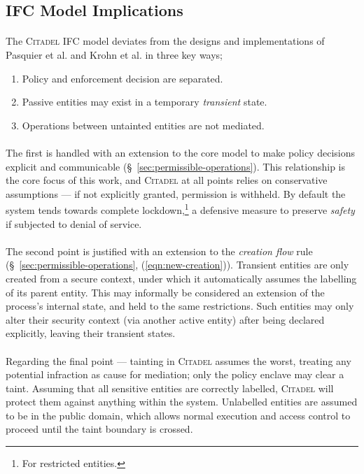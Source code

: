 \subsection{IFC Model Implications}
\label{sec:ifc-model-implications}

\paragraph{} The \textsc{Citadel} IFC model deviates from the designs and implementations of Pasquier et al. and Krohn et al. in three key ways;
\begin{enumerate}
    \item Policy and enforcement decision are separated.
    \item Passive entities may exist in a temporary \textit{transient} state.
    \item Operations between untainted entities are not mediated.
\end{enumerate}

\paragraph{} The first is handled with an extension to the core model to make policy decisions explicit and communicable (§~\ref{sec:permissible-operations}). This relationship is the core focus of this work, and \textsc{Citadel} at all points relies on conservative assumptions --- if not explicitly granted, permission is withheld. By default the system tends towards complete lockdown,\footnote{For restricted entities.} a defensive measure to preserve \textit{safety} if subjected to denial of service.

\paragraph{} The second point is justified with an extension to the \textit{creation flow} rule (§~\ref{sec:permissible-operations}, (\ref{eqn:new-creation})). Transient entities are only created from a secure context, under which it automatically assumes the labelling of its parent entity. This may informally be considered an extension of the process's internal state, and held to the same restrictions. Such entities may only alter their security context (via another active entity) after being declared explicitly, leaving their transient states. 

\paragraph{} Regarding the final point --- tainting in \textsc{Citadel} assumes the worst, treating any potential infraction as cause for mediation; only the policy enclave may clear a taint. Assuming that all sensitive entities are correctly labelled, \textsc{Citadel} will protect them against anything within the system. Unlabelled entities are assumed to be in the public domain, which allows normal execution and access control to proceed until the taint boundary is crossed.


